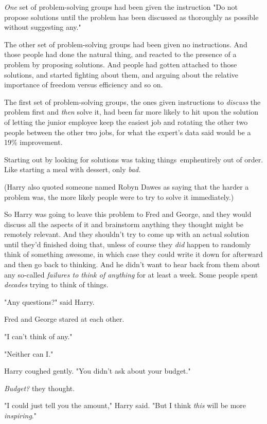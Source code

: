 \emph{One} set of problem-solving groups had been given the instruction "Do not 
propose solutions until the problem has been discussed as thoroughly as 
possible without suggesting any."

The other set of problem-solving groups had been given no instructions. And 
those people had done the natural thing, and reacted to the presence of a 
problem by proposing solutions. And people had gotten attached to those 
solutions, and started fighting about them, and arguing about the relative 
importance of freedom versus efficiency and so on.

The first set of problem-solving groups, the ones given instructions to 
\emph{discuss} the problem first and \emph{then} solve it, had been far more 
likely to hit upon the solution of letting the junior employee keep the easiest 
job and rotating the other two people between the other two jobs, for what the 
expert's data said would be a 19\% improvement.

Starting out by looking for solutions was taking things\ emph{entirely out of 
order.} Like starting a meal with dessert, only \emph{bad.}

(Harry also quoted someone named Robyn Dawes as saying that the harder a 
problem was, the more likely people were to try to solve it immediately.)

So Harry was going to leave this problem to Fred and George, and they would 
discuss all the aspects of it and brainstorm anything they thought might be 
remotely relevant. And they shouldn't try to come up with an actual solution 
until they'd finished doing that, unless of course they \emph{did} happen to 
randomly think of something awesome, in which case they could write it down for 
afterward and then go back to thinking. And he didn't want to hear back from 
them about any so-called \emph{failures to think of anything} for at least a 
week. Some people spent \emph{decades} trying to think of things.

"Any questions?" said Harry.

Fred and George stared at each other.

"I can't think of any."

"Neither can I."

Harry coughed gently. "You didn't ask about your budget."

\emph{Budget?} they thought.

"I could just tell you the amount," Harry said. "But I think \emph{this} will 
be more \emph{inspiring}."

